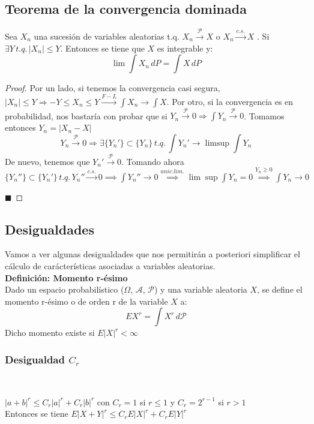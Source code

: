 \documentclass[12pt,a4paper]{book}
\newcommand*{\qed}{\hfill\ensuremath{\blacksquare}}
\begin{document}
\subsection{Teorema de la convergencia dominada}
\begin{theorem}
Sea $X_n$ una sucesión de variables aleatorias t.q.  $X_n \stackrel{\mathcal{P}}{\rightarrow} X$ o $X_n \stackrel{c.s.}{\rightarrow} X$  . Si $\exists Y \, t.q. \, |X_n |\leq Y$. Entonces se tiene que $X$ es integrable y:
$$\lim\int X_n\, dP=\int X\, dP$$
\end{theorem}

\begin{proof}
Por un lado, si tenemos la convergencia casi segura, $|X_n| \leq Y \Rightarrow -Y \leq X_n \leq Y \stackrel{F-L}{\rightarrow} \displaystyle \int X_n \to \int X$.
Por otro, si la convergencia es en probabilidad, nos bastaría con probar que si $Y_n \stackrel{\mathcal{P}}{\rightarrow} 0 \Rightarrow \displaystyle \int Y_n \stackrel{\mathcal{P}}{\rightarrow} 0$. Tomamos entonces $Y_n = |X_n - X|$
$$ Y_n \stackrel{\mathcal{P}}{\rightarrow} 0 \Rightarrow \exists \{Y_n'\} \subset \{Y_n\} \, t.q. \, \int Y_n' \rightarrow \limsup \int Y_n$$
De nuevo, tenemos que $Y_n' \stackrel{\mathcal{P}}{\rightarrow} 0$. Tomando ahora $\{Y_n''\} \subset \{Y_n'\} \, t.q. \, Y_n'' \stackrel{c.s.}{\rightarrow} 0 
\implies 
\displaystyle \int Y_n'' \rightarrow 0 \stackrel{unic.lim.}{\implies} \lim \sup \int Y_n = 0 \stackrel{Y_n \geq 0}{\implies} \int Y_n \rightarrow 0$

\qed
\end{proof}

\subsection{Desigualdades}

Vamos a ver algunas desigualdades que nos permitirán a posteriori simplificar el cálculo de carácterísticas asociadas a variables aleatorias.\\

\textbf{Definición: Momento r-ésimo}\\

Dado un espacio probabilístico ($\Omega$, $\mathcal{A}$, $\mathcal{P}$) y una variable aleatoria $X$, se define el momento r-ésimo o de orden r de la variable $X$ a:
$$ EX^r = \int X^r \, d \mathcal{P} $$
Dicho momento existe si $E|X|^r < \infty$

\subsubsection{Desigualdad $C_r$}
\begin{lemma}

\
	
$|a+b|^r\leq C_r |a|^r + C_r |b|^r$ con $C_r=1$ si $r\leq1$ y $C_r=2^{r-1}$ si $r>1$\\

Entonces se tiene $E|X+Y|^r \leq C_r E|X|^r + C_r E|Y|^r$
\end{lemma}
\end{document}
